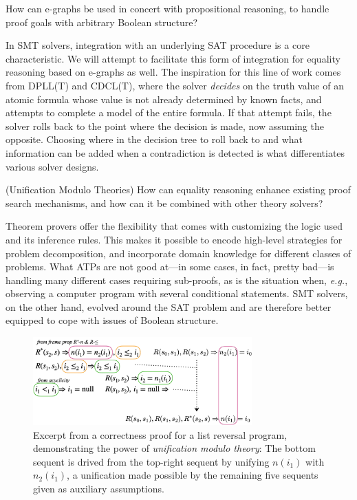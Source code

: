 \begin{researchquestion}How can e-graphs be used in concert with propositional reasoning, to handle proof goals with arbitrary Boolean structure?
\end{researchquestion}

In SMT solvers, integration with an underlying SAT procedure is a core characteristic.
We will attempt to facilitate this form of integration for equality reasoning based on e-graphs as well.
The inspiration for this line of work comes from DPLL(T) and CDCL(T), where the solver \emph{decides} on the truth value of an atomic formula whose value is not already determined by known facts, and attempts to complete a model of the entire formula.
If that attempt fails, the solver rolls back to the point where the decision is made, now assuming the opposite.
Choosing where in the decision tree to roll back to and what information can be added when a contradiction is detected is what differentiates various solver designs.


\begin{researchquestion}(Unification Modulo Theories) How can equality reasoning enhance existing proof search mechanisms, and how can it be combined with other theory solvers?
\end{researchquestion}

Theorem provers offer the flexibility that comes with customizing the logic used and its inference rules.
This makes it possible to encode high-level strategies for problem decomposition, and incorporate domain knowledge for different classes of problems.
What ATPs are not good at---in some cases, in fact, pretty bad---is
handling many different cases requiring sub-proofs,
as is the situation when, \emph{e.g.}, observing a computer program with several conditional statements.
SMT solvers, on the other hand, evolved around the SAT problem and are therefore better equipped to cope with issues of Boolean structure.

\begin{figure}
\centering
\includegraphics[width=0.75\textwidth]{img/unification-modulo-theories.pdf}
\caption{Excerpt from a correctness proof for a list reversal program, demonstrating the power of \emph{unification modulo theory}:
The bottom sequent is drived from the top-right sequent by unifying $n(i_1)$ with $n_2(i_1)$, a unification made possible by the remaining five sequents given as auxiliary assumptions.}
\label{unification:example}
\end{figure}

